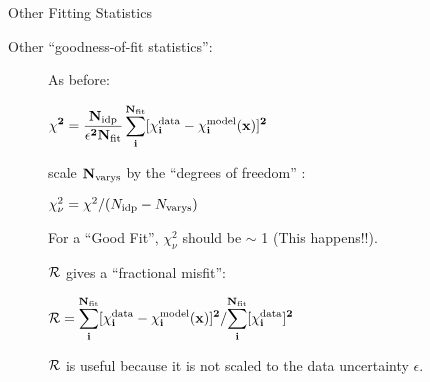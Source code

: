 \begin{slide}{Other Fitting Statistics}
\small

    Other ``goodness-of-fit statistics'':
    \begin{description}
    \item[{}] As before: \vmm

      $ \displaystyle{\mathbf{
          \chi^2  =  \frac{ N_{\rm idp}}{\epsilon^2 N_{\rm fit}}
          \sum_i^{N_{\rm fit}} [\chi_i^{\rm data} - \chi_i^{\rm model}({x})]^2
        }} 
      $
      
      
    \item[{}] scale $\mathbf{N_{\rm varys}}$ by the 
      ``degrees of freedom'' : \vmm

      $ \chi^2_\nu =  \chi^2 / (N_{\rm idp}-N_{\rm varys}) $


      \vmm

      
      For a ``Good Fit'', $\chi^2_\nu$ should be $\sim$ 1 (This
      {} happens!!).

    \item[{}] $\mathbf{\cal{R}}$  gives a ``fractional misfit'': \vmm

      $ \displaystyle{\mathbf{
          {\cal{R}} = 
          {\sum_i^{N_{\rm fit}}[\chi_i^{\rm data} - \chi_i^{\rm model}({x})]^2 }
          / 
           { \displaystyle{\sum_i^{N_{\rm fit}} [{\chi_i^{\rm data}}]^2}}
        }}
      $

      \vmm $\mathbf{\cal{R}}$ is useful because it is not scaled to the data
    uncertainty $\epsilon$. 

    \end{description}
\vfill
\end{slide} 



